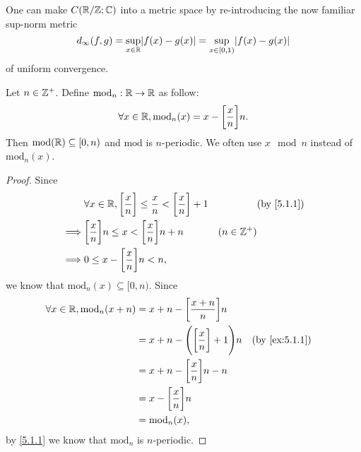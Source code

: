 \begin{note}
  One can make \(C(\mathbb{R} / \mathbb{Z} ; \mathbb{C})\) into a metric space by re-introducing the now familiar sup-norm metric
  \[
    d_\infty(f, g) = \sup_{x \in \R} \abs{f(x) - g(x)} = \sup_{x \in [0, 1)} \abs{f(x) - g(x)}
  \]
  of uniform convergence.
\end{note}

\begin{ac}\label{ac:5.1.1}
  Let \(n \in \mathbb{Z}^+\).
  Define \(\text{mod}_n : \mathbb{R} \to \mathbb{R}\) as follow:
  \[
    \forall x \in \mathbb{R}, \text{mod}_n(x) = x - \bigg[\dfrac{x}{n}\bigg] n.
  \]
  Then \(\text{mod}(\mathbb{R}) \subseteq [0, n)\) and \(\text{mod}\) is \(n\)-periodic.
  We often use \(x \mod n\) instead of \(\text{mod}_n(x)\).
\end{ac}

\begin{proof}
  Since
  \begin{align*}
             & \forall x \in \R, \bigg[\dfrac{x}{n}\bigg] \leq \dfrac{x}{n} < \bigg[\dfrac{x}{n}\bigg] + 1 &              & \text{(by \cref{5.1.1})} \\
    \implies & \bigg[\dfrac{x}{n}\bigg] n \leq x < \bigg[\dfrac{x}{n}\bigg] n + n                          & (n \in \Z^+)                            \\
    \implies & 0 \leq x - \bigg[\dfrac{x}{n}\bigg] n < n,
  \end{align*}
  we know that \(\text{mod}_n(x) \subseteq [0, n)\).
  Since
  \begin{align*}
    \forall x \in \R, \text{mod}_n(x + n) & = x + n - \bigg[\dfrac{x + n}{n}\bigg] n                                              \\
                                          & = x + n - \Bigg(\bigg[\dfrac{x}{n}\bigg] + 1\Bigg) n &  & \text{(by \cref{ex:5.1.1})} \\
                                          & = x + n - \bigg[\dfrac{x}{n}\bigg] n - n                                              \\
                                          & = x - \bigg[\dfrac{x}{n}\bigg] n                                                      \\
                                          & = \text{mod}_n(x),
  \end{align*}
  by \cref{5.1.1} we know that \(\text{mod}_n\) is \(n\)-periodic.
\end{proof}

\exercisesection

